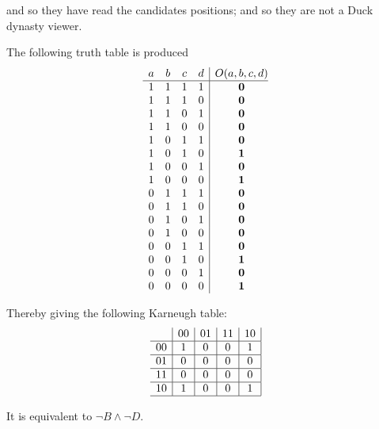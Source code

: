 \documentclass[letter]{article}
\newenvironment{menumerate}{%
  \edef\backupindent{\the\parindent}%
  \enumerate%
  \setlength{\parindent}{\backupindent}%
}{\endenumerate}
\begin{document}
\begin{menumerate}
\begin{menumerate}
        and so they have read the candidates positions; and so
        they are not a Duck dynasty viewer.
      \end{menumerate}
    \item 
    \begin{menumerate}
      \item The following truth table is produced
      \begin{equation}
      \begin{array}{cccc|c@{}ccccccccccc@{}ccc@{}cccccccccc@{}ccc@{}cccccccccc@{}ccc@{}ccccccccc@{}c}
        a&b&c&d&O(a,b,c,d)\\\hline
        1&1&1&1&\mathbf{0}\\
        1&1&1&0&\mathbf{0}\\
        1&1&0&1&\mathbf{0}\\
        1&1&0&0&\mathbf{0}\\
        1&0&1&1&\mathbf{0}\\
        1&0&1&0&\mathbf{1}\\
        1&0&0&1&\mathbf{0}\\
        1&0&0&0&\mathbf{1}\\
        0&1&1&1&\mathbf{0}\\
        0&1&1&0&\mathbf{0}\\
        0&1&0&1&\mathbf{0}\\
        0&1&0&0&\mathbf{0}\\
        0&0&1&1&\mathbf{0}\\
        0&0&1&0&\mathbf{1}\\
        0&0&0&1&\mathbf{0}\\
        0&0&0&0&\mathbf{1}\\
        \end{array}
      \end{equation}
      \item Thereby giving the following Karneugh table:
      \begin{equation}
        \begin{array}{c|c|c|c|c|}
              &00&01&11&10 \\\hline
            00&1&0&0&1\\\hline
            01&0&0&0&0\\\hline
            11&0&0&0&0\\\hline
            10&1&0&0&1\\\hline
        \end{array}
      \end{equation}
      \item It is equivalent to $\neg B \wedge \neg D.$

\end{menumerate}
\end{menumerate}
\end{document}
